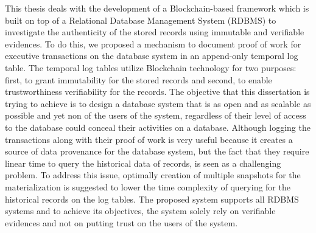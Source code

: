This thesis deals with the development of a Blockchain-based framework which is built on top of a Relational Database Management System (RDBMS) to investigate the authenticity of the stored records using immutable and verifiable evidences. To do this, we proposed a mechanism to document proof of work for executive transactions on the database system in an append-only temporal log table. The temporal log tables utilize Blockchain technology for two purposes: first, to grant immutability for the stored records and second, to enable trustworthiness verifiability for the records. The objective that this dissertation is trying to achieve is to design a database system that is as open and as scalable as possible and yet non of the users of the system, regardless of their level of access to the database could conceal their activities on a database. 
Although logging the transactions along with their proof of work is very useful because it creates a source of data provenance for the database system, but the fact that they require linear time to query the historical data of records, is seen as a challenging problem. To address this issue, optimally creation of multiple snapshots for the materialization is suggested to lower the time complexity of querying for the historical records on the log tables. The proposed system supports all RDBMS systems and to achieve its objectives, the system solely rely on verifiable evidences and not on putting trust on the users of the system.
